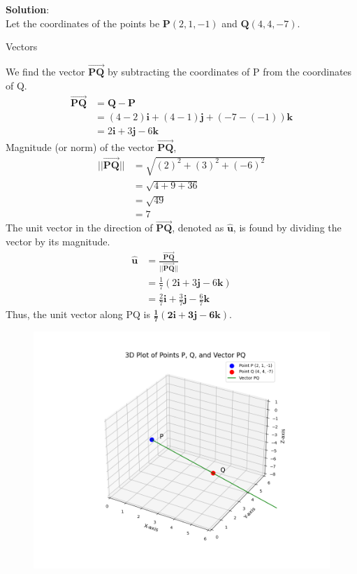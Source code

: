 \documentclass[journal]{IEEEtran}
\begin{document}
\textbf{Solution}:\\
Let the coordinates of the points be $\mathbf{P}(2, 1, -1)$ and $\mathbf{Q}(4, 4, -7)$.
\begin{table}[H]    
  \centering
  
  \caption{Vectors}
  \label{Answers}
\end{table}
We find the vector $\vec{\mathbf{PQ}}$ by subtracting the coordinates of P from the coordinates of Q.
\begin{align}
    \vec{\mathbf{PQ}} &= \mathbf{Q} - \mathbf{P} \\
    &= (4-2)\mathbf{i} + (4-1)\mathbf{j} + (-7 - (-1))\mathbf{k} \\
    &= 2\mathbf{i} + 3\mathbf{j} - 6\mathbf{k}
\end{align}
Magnitude (or norm) of the vector $\vec{\mathbf{PQ}}$,
\begin{align}
    ||\vec{\mathbf{PQ}}|| &= \sqrt{(2)^2 + (3)^2 + (-6)^2} \\
    &= \sqrt{4 + 9 + 36} \\
    &= \sqrt{49} \\
    &= 7
\end{align}
The unit vector in the direction of $\vec{\mathbf{PQ}}$, denoted as $\mathbf{\hat{u}}$, is found by dividing the vector by its magnitude.
\begin{align}
    \mathbf{\hat{u}} &= \frac{\vec{\mathbf{PQ}}}{||\vec{\mathbf{PQ}}||} \\
    &= \frac{1}{7}(2\mathbf{i} + 3\mathbf{j} - 6\mathbf{k}) \\
    &= \frac{2}{7}\mathbf{i} + \frac{3}{7}\mathbf{j} - \frac{6}{7}\mathbf{k}
\end{align}
Thus, the unit vector along PQ is $\mathbf{\frac{1}{7}(2\mathbf{i} + 3\mathbf{j} - 6\mathbf{k})}$.
\begin{figure}[H]
\begin{center}
\includegraphics[width=0.9\columnwidth]{figs/fig1.png}
\end{center}
\caption{}
\label{fig:Fig.1}
\end{figure}
\end{document}
